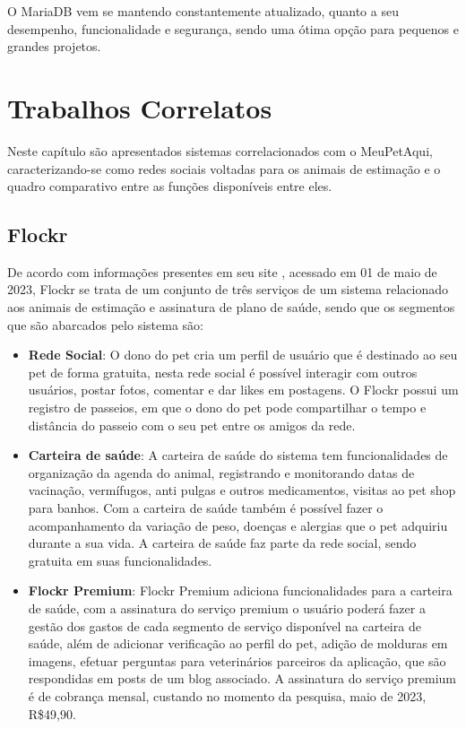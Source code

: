 O MariaDB vem se mantendo constantemente atualizado, quanto a seu desempenho, funcionalidade e segurança, sendo uma ótima opção para pequenos e grandes projetos.

\newpage
\chapter{Trabalhos Correlatos}
Neste capítulo são apresentados sistemas correlacionados com o MeuPetAqui, caracterizando-se como redes sociais voltadas para os animais de estimação e o quadro comparativo entre as funções disponíveis entre eles.

\section{Flockr}
De acordo com informações presentes em seu site , acessado em 01 de maio de 2023, Flockr se trata de um conjunto de três serviços de um sistema relacionado aos animais de estimação e assinatura de plano de saúde, sendo que os segmentos que são abarcados pelo sistema são: 

\begin{itemize}
\item {\bf Rede Social}: O dono do pet cria um perfil de usuário que é destinado ao seu pet de forma gratuita, nesta rede social é possível interagir com outros usuários,  postar fotos, comentar e dar likes em postagens. O Flockr possui um registro de passeios, em que o dono do pet pode compartilhar o tempo e distância do passeio com o seu pet entre os amigos da rede.

\newpage
\item {\bf Carteira de saúde}: A carteira de saúde do sistema tem funcionalidades de organização da agenda do animal, registrando e monitorando datas de vacinação, vermífugos, anti pulgas e outros medicamentos, visitas ao pet shop para banhos. Com a carteira de saúde também é possível fazer o acompanhamento da variação de peso, doenças e alergias que o pet adquiriu durante a sua vida. A carteira de saúde faz parte da rede social, sendo gratuita em suas funcionalidades.

\item {\bf Flockr Premium}: Flockr Premium adiciona funcionalidades para a carteira de saúde, com a assinatura do serviço premium o usuário poderá fazer a gestão dos gastos de cada segmento de serviço disponível na carteira de saúde, além de adicionar verificação ao perfil do pet, adição de molduras em imagens, efetuar perguntas para veterinários parceiros da aplicação, que são respondidas em posts de um blog associado. A assinatura do serviço premium é de cobrança mensal, custando no momento da pesquisa, maio de 2023, R\$49,90.
\end{itemize}

